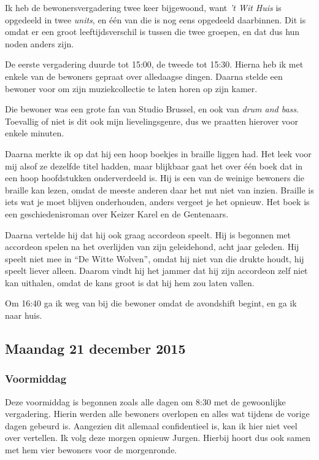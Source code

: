 \documentclass[a4paper,12pt]{article}
\begin{document}
Ik heb de bewonersvergadering twee keer bijgewoond, want \emph{'t Wit Huis} is opgedeeld in twee \emph{units}, en één van die is nog eens opgedeeld daarbinnen. Dit is omdat er een groot leeftijdsverschil is tussen die twee groepen, en dat dus hun noden anders zijn.

De eerste vergadering duurde tot 15:00, de tweede tot 15:30. Hierna heb ik met enkele van de bewoners gepraat over alledaagse dingen. Daarna stelde een bewoner voor om zijn muziekcollectie te laten horen op zijn kamer.

Die bewoner was een grote fan van Studio Brussel, en ook van \emph{drum and bass}. Toevallig of niet is dit ook mijn lievelingsgenre, dus we praatten hierover voor enkele minuten.

Daarna merkte ik op dat hij een hoop boekjes in braille liggen had. Het leek voor mij alsof ze dezelfde titel hadden, maar blijkbaar gaat het over één boek dat in een hoop hoofdstukken onderverdeeld is. Hij is een van de weinige bewoners die braille kan lezen, omdat de meeste anderen daar het nut niet van inzien. Braille is iets wat je moet blijven onderhouden, anders vergeet je het opnieuw. Het boek is een geschiedenisroman over Keizer Karel en de Gentenaars.

Daarna vertelde hij dat hij ook graag accordeon speelt. Hij is begonnen met accordeon spelen na het overlijden van zijn geleidehond, acht jaar geleden. Hij speelt niet mee in ``De Witte Wolven'', omdat hij niet van die drukte houdt, hij speelt liever alleen. Daarom vindt hij het jammer dat hij zijn accordeon zelf niet kan uithalen, omdat de kans groot is dat hij hem zou laten vallen.

Om 16:40 ga ik weg van bij die bewoner omdat de avondshift begint, en ga ik naar huis.

\subsection{Maandag 21 december 2015}
\subsubsection{Voormiddag}
Deze voormiddag is begonnen zoals alle dagen om 8:30 met de gewoonlijke vergadering. Hierin werden alle bewoners overlopen en alles wat tijdens de vorige dagen gebeurd is. Aangezien dit allemaal confidentieel is, kan ik hier niet veel over vertellen. Ik volg deze morgen opnieuw Jurgen. Hierbij hoort dus ook samen met hem vier bewoners voor de morgenronde.
\end{document}
